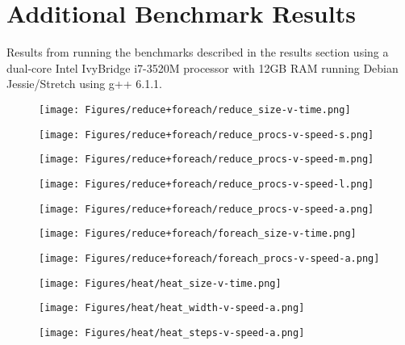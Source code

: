 \chapter{Additional Benchmark Results}

Results from running the benchmarks described in the results section using a
dual-core Intel IvyBridge i7-3520M processor with 12GB RAM running Debian
Jessie/Stretch using g++ 6.1.1.

\begin{figure}[!h]
\centering
    \texttt{[image: Figures/reduce+foreach/reduce\_size-v-time.png]}
\end{figure}
\begin{figure}[!h]
\centering
    \texttt{[image: Figures/reduce+foreach/reduce\_procs-v-speed-s.png]}
\end{figure}
\begin{figure}[!h]
\centering
    \texttt{[image: Figures/reduce+foreach/reduce\_procs-v-speed-m.png]}
\end{figure}
\begin{figure}[!h]
\centering
    \texttt{[image: Figures/reduce+foreach/reduce\_procs-v-speed-l.png]}
\end{figure}
\begin{figure}[!h]
\centering
    \texttt{[image: Figures/reduce+foreach/reduce\_procs-v-speed-a.png]}
\end{figure}

\begin{figure}[!h]
\centering
    \texttt{[image: Figures/reduce+foreach/foreach\_size-v-time.png]}
\end{figure}
\begin{figure}[!h]
\centering
    \texttt{[image: Figures/reduce+foreach/foreach\_procs-v-speed-a.png]}
\end{figure}

\begin{figure}[!h]
\centering
    \texttt{[image: Figures/heat/heat\_size-v-time.png]}
\end{figure}
\begin{figure}[!h]
\centering
    \texttt{[image: Figures/heat/heat\_width-v-speed-a.png]}
\end{figure}
\begin{figure}[!h]
\centering
    \texttt{[image: Figures/heat/heat\_steps-v-speed-a.png]}
\end{figure}

